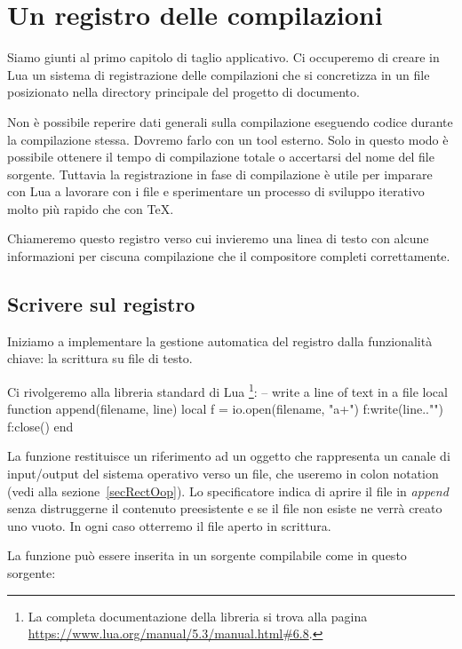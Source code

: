 

\chapter{Un registro delle compilazioni}
\label{iichRegistro}

Siamo giunti al primo capitolo di taglio applicativo. Ci occuperemo di creare
in Lua un sistema di registrazione delle compilazioni che si concretizza in un
file posizionato nella directory principale del progetto di documento.

Non è possibile reperire dati generali sulla compilazione eseguendo codice
durante la compilazione stessa. Dovremo farlo con un tool esterno. Solo in
questo modo è possibile ottenere il tempo di compilazione totale o accertarsi
del nome del file sorgente. Tuttavia la registrazione in fase di compilazione è
utile per imparare con Lua a lavorare con i file e sperimentare un processo di
sviluppo iterativo molto più rapido che con \TeX.

Chiameremo questo registro  verso cui invieremo una linea di
testo con alcune informazioni per ciscuna compilazione che il compositore
completi correttamente.


\section{Scrivere sul registro}

Iniziamo a implementare la gestione automatica del registro dalla funzionalità
chiave: la scrittura su file di testo.

Ci rivolgeremo alla libreria standard di Lua \footnote{La completa
documentazione della libreria  si trova alla pagina
\url{https://www.lua.org/manual/5.3/manual.html\#6.8}.}:
\lines
-- write a line of text in a file
local function append(filename, line)
    local f = io.open(filename, "a+")
    f:write(line.."\n")
    f:close()
end
\endlines
{}

La funzione  restituisce un riferimento ad un oggetto che
rappresenta un canale di input/output del sistema operativo verso un file, che
useremo in colon notation (vedi alla sezione~\ref{secRectOop}). Lo specificatore
 indica di aprire il file in \emph{append} senza distruggerne il
contenuto preesistente e se il file non esiste ne verrà creato uno vuoto. In
ogni caso otterremo il file aperto in scrittura.

La funzione  può essere inserita in un sorgente \LuaTeX{}
compilabile come in questo sorgente:


